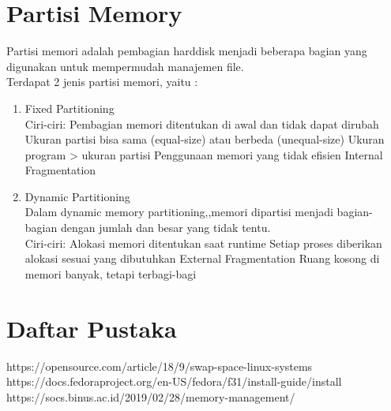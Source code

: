\documentclass[a4paper,12pt]{article}
\begin{document}
\section{Partisi Memory}
Partisi memori adalah pembagian harddisk menjadi beberapa bagian yang digunakan untuk mempermudah manajemen file.\\
Terdapat 2 jenis partisi memori, yaitu :
\begin{enumerate}
    \item Fixed Partitioning\\
        Ciri-ciri:
        \subitem Pembagian memori ditentukan di awal dan tidak dapat dirubah
        \subitem Ukuran partisi bisa sama (equal-size) atau berbeda (unequal-size)
        \subitem Ukuran program > ukuran partisi
        \subitem Penggunaan memori yang tidak efisien
        \subitem Internal Fragmentation

    \item Dynamic Partitioning\\
        Dalam dynamic memory partitioning,,memori dipartisi menjadi bagian-bagian dengan jumlah dan besar yang tidak tentu.\\
        Ciri-ciri:
        \subitem Alokasi memori ditentukan saat runtime
        \subitem Setiap proses diberikan alokasi sesuai yang dibutuhkan
        \subitem External Fragmentation
        \subitem Ruang kosong di memori banyak, tetapi terbagi-bagi

\end{enumerate}

\newpage
\section{Daftar Pustaka}
https://opensource.com/article/18/9/swap-space-linux-systems\\
https://docs.fedoraproject.org/en-US/fedora/f31/install-guide/install\\
https://socs.binus.ac.id/2019/02/28/memory-management/
\end{document}

